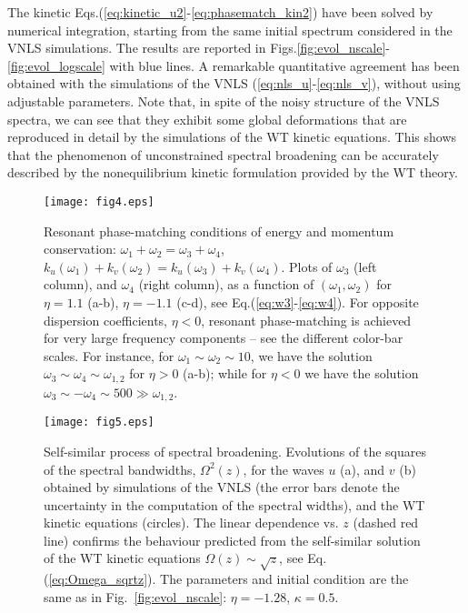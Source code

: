 \documentclass[pra,twocolumn,showpacs,preprintnumbers,amsmath,amssymb]{revtex4}
\begin{document}
The kinetic Eqs.(\ref{eq:kinetic_u2}-\ref{eq:phasematch_kin2}) have been solved by numerical integration, starting from the same initial spectrum considered in the VNLS simulations.
The results are reported in Figs.\ref{fig:evol_nscale}-\ref{fig:evol_logscale} with blue lines.
A remarkable quantitative agreement has been obtained with the simulations of the VNLS (\ref{eq:nls_u}-\ref{eq:nls_v}), without using adjustable parameters.
Note that, in spite of the noisy structure of the VNLS spectra, we can see that they exhibit some global deformations that are reproduced in detail by the simulations of the WT kinetic equations.
This shows that the phenomenon of unconstrained spectral broadening can be accurately described by the nonequilibrium kinetic formulation provided by the WT theory.
 






\begin{center}
\begin{figure}[t]
\texttt{[image: fig4.eps]}
\caption{Resonant phase-matching conditions of energy and momentum conservation: $\omega_1+\omega_2=\omega_3+\omega_4$, $ k_u(\omega_1)+ k_v(\omega_2) = k_u(\omega_3)+ k_v(\omega_4)$. 
Plots of $\omega_3$ (left column), and $\omega_4$ (right column), as a function of $(\omega_1,\omega_2)$ for $\eta=1.1$ (a-b), $\eta=-1.1$ (c-d), see Eq.(\ref{eq:w3}-\ref{eq:w4}).
For opposite dispersion coefficients, $\eta < 0$, resonant phase-matching is achieved for very large frequency components -- see the different color-bar scales.
For instance, for $\omega_1 \sim \omega_2 \sim 10$, we have the solution $\omega_3 \sim \omega_4 \sim \omega_{1,2}$ for $\eta > 0$ (a-b); while for $\eta < 0$ we have the solution $\omega_3 \sim - \omega_4 \sim 500 \gg \omega_{1,2}$.
}
\label{fig:resonance}
\end{figure}
\end{center}



\begin{center}
\begin{figure}[t]
\texttt{[image: fig5.eps]}
\caption{Self-similar process of spectral broadening. 
Evolutions of the squares of the spectral bandwidths, $\Omega^2(z)$, for the waves $u$ (a), and $v$ (b) obtained by simulations of the VNLS (the error bars denote the uncertainty in the computation of the spectral widths), and the WT kinetic equations (circles). The linear dependence vs. $z$ (dashed red line) confirms the behaviour predicted from the self-similar solution of the WT kinetic equations $\Omega(z) \sim \sqrt{z}$, see Eq.(\ref{eq:Omega_sqrtz}).
The parameters and initial condition are the same as in Fig.~\ref{fig:evol_nscale}: 
$\eta = -1.28$, $\kappa=0.5$.}
\label{fig:Omega_sqrtz}
\end{figure}
\end{center}
\end{document}
